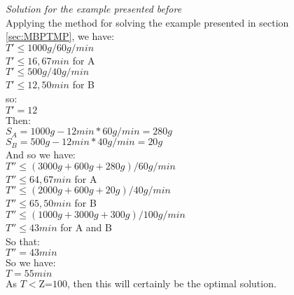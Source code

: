 \documentclass[preprint,12pt,authoryear]{elsarticle}
\begin{document}
\emph{Solution for the example presented before} \\

Applying the method for solving the example presented in section \ref{sec:MBPTMP}, we have: \\

$T' \leq 1000g / 60g/min$ \\

$T' \leq 16,67 min$ \quad for A \\

$T' \leq 500g / 40g/min$ \\

$T' \leq 12,50 min$ \quad for B \\

so: \\

$T' = 12$ \\

Then:\\

$S_A = 1000g - 12min * 60g/min = 280g$ \\

$S_B = 500g - 12min * 40g/min = 20g$ \\

And so we have: \\

$T'' \leq (3000g + 600g + 280g) / 60g/min$ \\

$T'' \leq 64,67 min$ \quad for A \\

$T'' \leq (2000g + 600g + 20g) / 40g/min$ \\

$T'' \leq 65,50 min$ \quad for B \\

$T'' \leq (1000g + 3000g + 300g) / 100g/min$ \\

$T'' \leq 43 min$ \quad for A and B \\

So that: \\

$T'' = 43 min$ \\

So we have: \\

$ T = 55 min$ \\

As $T<\textrm{Z=100}$, then this will certainly be the optimal solution. \\
\end{document}
